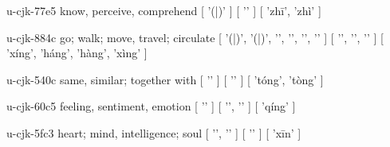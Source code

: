 \begin{multicols}{2}
\cjkgGlue{} u-cjk-77e5  know, perceive, comprehend  [ '\cjkgGlue{}(\cjkgGlue{}|\cjkgGlue{})' ]  [ '\cjkgGlue{}' ]  [ 'zh{\mktsRsgFb{}ī}', 'zhì' ] 

\cjkgGlue{} u-cjk-884c  go; walk; move, travel; circulate  [ '\cjkgGlue{}(\cjkgGlue{}|\cjkgGlue{})', '\cjkgGlue{}(\cjkgGlue{}|\cjkgGlue{})', '\cjkgGlue{}', '\cjkgGlue{}', '\cjkgGlue{}', '\cjkgGlue{}' ]  [ '\cjkgGlue{}', '\cjkgGlue{}', '\cjkgGlue{}' ]  [ 'xíng', 'háng', 'hàng', 'xìng' ] 

\cjkgGlue{} u-cjk-540c  same, similar; together with  [ '\cjkgGlue{}' ]  [ '\cjkgGlue{}' ]  [ 'tóng', 'tòng' ] 

\cjkgGlue{} u-cjk-60c5  feeling, sentiment, emotion  [ '\cjkgGlue{}' ]  [ '\cjkgGlue{}', '\cjkgGlue{}' ]  [ 'qíng' ] 

\cjkgGlue{} u-cjk-5fc3  heart; mind, intelligence; soul  [ '\cjkgGlue{}', '\cjkgGlue{}' ]  [ '\cjkgGlue{}' ]  [ 'x{\mktsRsgFb{}ī}n' ] 


\end{multicols}
